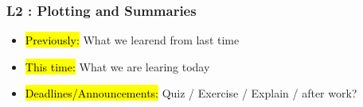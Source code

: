 
\begin{frame}
    \frametitle{L2 : Plotting and Summaries }
    \begin{itemize}
        \item \hl{Previously: } What we learend from last time
        \item \hl{This time: } What we are learing today
        \item \hl{Deadlines/Announcements: } Quiz / Exercise / Explain / after work?
    \end{itemize}
    
    \end{frame}
    